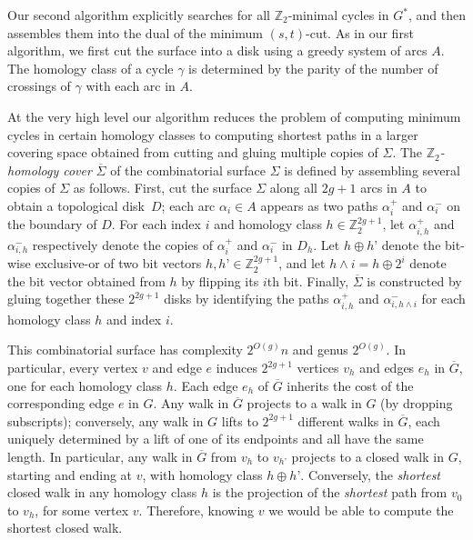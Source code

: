 \documentclass[natbib]{svcyclop}
\def\Z{\mathbb{Z}}
\begin{document}
Our second algorithm \cite{homcover} explicitly searches for all $\Z_2$-minimal cycles in $G^*$, and then assembles them into the dual of the minimum $(s,t)$-cut.
As in our first algorithm, we first cut the surface into a disk using a greedy system of arcs $A$.  The homology class of a cycle $\gamma$ is determined by the parity of the number of crossings of $\gamma$ with each arc in $A$.

At the very high level our algorithm reduces the problem of computing minimum cycles in certain homology classes to computing shortest paths in a larger covering space obtained from cutting and gluing multiple copies of $\Sigma$.
The \emph{$\Z_2$-homology cover} $\overline\Sigma$ of the combinatorial surface $\Sigma$ is defined by assembling several copies of $\Sigma$ as follows.  First, cut the surface $\Sigma$ along all $2g+1$ arcs in $A$ to obtain a topological disk~$D$; each arc $\alpha_i\in A$ appears as two paths $\alpha_i^+$ and $\alpha_i^-$ on the boundary of $D$.  For each index $i$ and homology class $h\in\Z_2^{2g+1}$, let $\alpha^+_{i,h}$ and $\alpha^-_{i,h}$ respectively denote the copies of $\alpha_i^+$ and $\alpha_i^-$ in $D_h$.  Let $h\oplus h’$ denote the bit-wise exclusive-or of two bit vectors $h, h’\in\Z_2^{2g+1}$, and let $h \land i = h\oplus 2^i$ denote the bit vector obtained from $h$ by flipping its $i$th bit.  Finally, $\overline\Sigma$ is constructed by gluing together these $2^{2g+1}$ disks by identifying the paths $\alpha^+_{i,h}$ and $\alpha^-_{i,h \land i}$ for each homology class $h$ and index $i$.  

This combinatorial surface has complexity $2^{O(g)}n$ and genus $2^{O(g)}$.  In particular, 
every vertex $v$ and edge $e$ induces $2^{2g+1}$ vertices $v_h$ and edges $e_h$ in $\overline{G}$, one for each homology class $h$.  Each edge $e_h$ of $\overline{G}$ inherits the cost of the corresponding edge $e$ in $G$.  
Any walk in $\overline{G}$ projects to a walk in $G$ (by dropping subscripts); conversely, any walk in $G$ lifts to $2^{2g+1}$ different walks in $\overline{G}$, each uniquely determined by a lift of one of its endpoints and all have the same length.  In particular, any walk in $\overline{G}$ from $v_h$ to $v_{h’}$ projects to a closed walk in $G$, starting and ending at $v$, with homology class $h\oplus h’$.  Conversely, the \emph{shortest} closed walk in any homology class $h$ is the projection of the \emph{shortest} path from $v_0$ to $v_h$, for some vertex $v$.  Therefore, knowing $v$ we would be able to compute the shortest closed walk.
\end{document}
